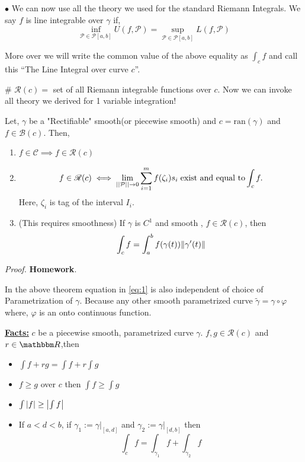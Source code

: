 \documentclass[../Analysis-3]{subfiles}
\begin{document}
$\bullet$ We can now use all the theory we used for the standard Riemann Integrals. We say $f$ is line integrable over $\gamma$ if,
\[\inf_{\mathcal{P} \in \mathscr{P}[a,b]} U(f,\mathcal{P}) = \sup_{\mathcal{P} \in \mathscr{P}[a,b]} L(f,\mathcal{P})\]

More over we will write the common value of the above equality as $\int_c f$ and call this ``The Line Integral over curve $c$''.

\# \textbf{$\mathscr{R}(c)=$} set of all Riemann integrable functions over $c$. Now we can invoke all theory we derived for 1 variable integration!

\begin{Thm}{}{}\label{thm1:23}
    Let, $\gamma$ be a "Rectifiable" smooth(or piecewise smooth) and $c = \text{ran}(\gamma)$ and $f \in \mathscr{B}(c)$. Then,
    \begin{enumerate}
        \item $f \in \mathscr{C} \implies f \in \mathscr{R}(c)$
        \item \[ f \in \mathscr{R}(c) \iff \lim_{||\mathcal{P}||\to 0} \sum_{i=1}^{m} f(\zeta_i)s_i \hspace{0.1cm} \text{exist and equal to}\int_c f.\] Here, $\zeta_i$ is tag of the interval $I_i$.

        \item (This requires smoothness) If $\gamma$ is $C^1$ and smooth , $f \in \mathscr{R}(c)$, then
              \[\int_c f = \int_a^b f(\gamma(t))\norm{\gamma'(t)} \label{eq:1}\]

    \end{enumerate}
\end{Thm}

\textit{Proof.} \textbf{Homework}.

\vspace{0.2cm}

In the above theorem equation in \ref{eq:1} is also independent of choice of Parametrization of $\gamma$. Because any other smooth parametrized curve $\tilde{\gamma} = \gamma \circ \varphi$ where, $\varphi$ is an onto continuous function.

\vspace{1cm}

\textbf{\underline{Facts:}} $c$ be a piecewise smooth, parametrized curve $\gamma$. $f,g \in \mathscr{R}(c)$ and $r \in \R$,then
\begin{itemize}
    \item $\int f+rg = \int f + r\int g $
    \item $f \ge g$ over $c$ then $\int f \ge \int g$
    \item $\int \abs{f} \ge \abs{\int f}$
    \item If $a<d<b$, if $\gamma_1 := \gamma |_{[a,d]}$ and $\gamma_2 := \gamma |_{[d,b]}$ then
          \[\int_c f = \int_{\gamma_1}f + \int_{\gamma_2} f \]
\end{itemize}
\end{document}
